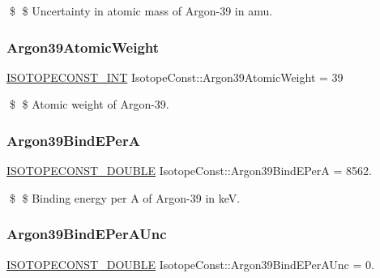 \$ \$ Uncertainty in atomic mass of Argon-\/39 in amu. \mbox{\label{group___isotope_const-_argon-_ar39_ga33e452ad1b78248d6bb51a4231b8df7e}} 
\subsubsection{\texorpdfstring{Argon39\+Atomic\+Weight}{Argon39AtomicWeight}}
{\footnotesize\ttfamily \mbox{\hyperlink{group___isotope_const-_macros_ga5f18360b3e99483a35c32d789e62621c}{I\+S\+O\+T\+O\+P\+E\+C\+O\+N\+S\+T\+\_\+\+I\+NT}} Isotope\+Const\+::\+Argon39\+Atomic\+Weight = 39}

\$ \$ Atomic weight of Argon-\/39. \mbox{\label{group___isotope_const-_argon-_ar39_ga8c6d6f31d40448146839c5240aaa8f21}} 
\subsubsection{\texorpdfstring{Argon39\+Bind\+E\+PerA}{Argon39BindEPerA}}
{\footnotesize\ttfamily \mbox{\hyperlink{group___isotope_const-_macros_ga8f45a7272ce02c0b4c65c44636ed719a}{I\+S\+O\+T\+O\+P\+E\+C\+O\+N\+S\+T\+\_\+\+D\+O\+U\+B\+LE}} Isotope\+Const\+::\+Argon39\+Bind\+E\+PerA = 8562.}

\$ \$ Binding energy per A of Argon-\/39 in keV. \mbox{\label{group___isotope_const-_argon-_ar39_ga99226e226b0d020eb7882e91c1b3c364}} 
\subsubsection{\texorpdfstring{Argon39\+Bind\+E\+Per\+A\+Unc}{Argon39BindEPerAUnc}}
{\footnotesize\ttfamily \mbox{\hyperlink{group___isotope_const-_macros_ga8f45a7272ce02c0b4c65c44636ed719a}{I\+S\+O\+T\+O\+P\+E\+C\+O\+N\+S\+T\+\_\+\+D\+O\+U\+B\+LE}} Isotope\+Const\+::\+Argon39\+Bind\+E\+Per\+A\+Unc = 0.}

